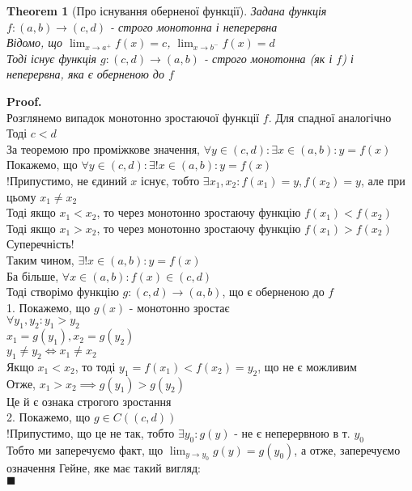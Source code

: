 \documentclass[a4paper, 14pt]{extarticle}
\def\huge{\displaystyle}
\def\bigline{\vspace{5mm}\\}
\theoremstyle{theoremdd}
\newtheorem{theorem}{Theorem}[subsection]
\theoremstyle{theoremdd}
\theoremstyle{theoremdd}
\theoremstyle{theoremdd}
\theoremstyle{theoremdd}
\theoremstyle{theoremdd}
\theoremstyle{theoremdd}
\theoremstyle{theoremdd}
\newenvironment{pf}{\vspace*{-3mm} \textbf{Proof. \\}}{$\blacksquare$}
\begin{document}
\begin{theorem}[Про існування оберненої функції]
Задана функція $f: (a,b) \to (c,d)$ - строго монотонна і неперервна\\
Відомо, що $\huge \lim_{x \to a^+} f(x) = c$, $\huge \lim_{x \to b^-} f(x) = d$\\
Тоді існує функція $g: (c,d) \to (a,b)$ - строго монотонна (як і $f$) і неперервна, яка є оберненою до $f$
\end{theorem}

\begin{pf}
Розглянемо випадок монотонно зростаючої функції $f$. Для спадної аналогічно\\
Тоді $c < d$\\
За теоремою про проміжкове значення, $\forall y \in (c,d): \exists x \in (a,b): y = f(x)$\\
Покажемо, що $\forall y \in (c,d): \exists ! x \in (a,b): y = f(x)$\\
!Припустимо, не єдиний $x$ існує, тобто $\exists x_1, x_2: f(x_1) = y, f(x_2) = y$, але при цьому $x_1 \neq x_2$\\
Тоді якщо $x_1 < x_2$, то через монотонно зростаючу функцію $f(x_1) < f(x_2)$\\
Тоді якщо $x_1 > x_2$, то через монотонно зростаючу функцію $f(x_1) > f(x_2)$\\
Суперечність!\\
Таким чином, $\exists ! x \in (a,b): y = f(x)$\\
Ба більше, $\forall x \in (a,b): f(x) \in (c,d)$\\
Тоді створімо функцію $g: (c,d) \to (a,b)$, що є оберненою до $f$\\
1. Покажемо, що $g(x)$ - монотонно зростає\\
$\forall y_1,y_2: y_1 > y_2$\\
$x_1 = g(y_1), x_2 = g(y_2)$\\
$y_1 \neq y_2 \iff x_1 \neq x_2$\\
Якщо $x_1 < x_2$, то тоді $y_1 = f(x_1) < f(x_2) = y_2$, що не є можливим\\
Отже, $x_1 > x_2 \implies g(y_1) > g(y_2)$\\
Це й є ознака строгого зростання
\bigline
2. Покажемо, що $g \in C((c,d))$\\
!Припустимо, що це не так, тобто $\exists y_0: g(y)$ - не є неперервною в т. $y_0$\\
Тобто ми заперечуємо факт, що $\huge \lim_{y \to y_0} g(y) = g(y_0)$, а отже, заперечуємо означення Гейне, яке має такий вигляд:\\

\end{pf}
\end{document}

